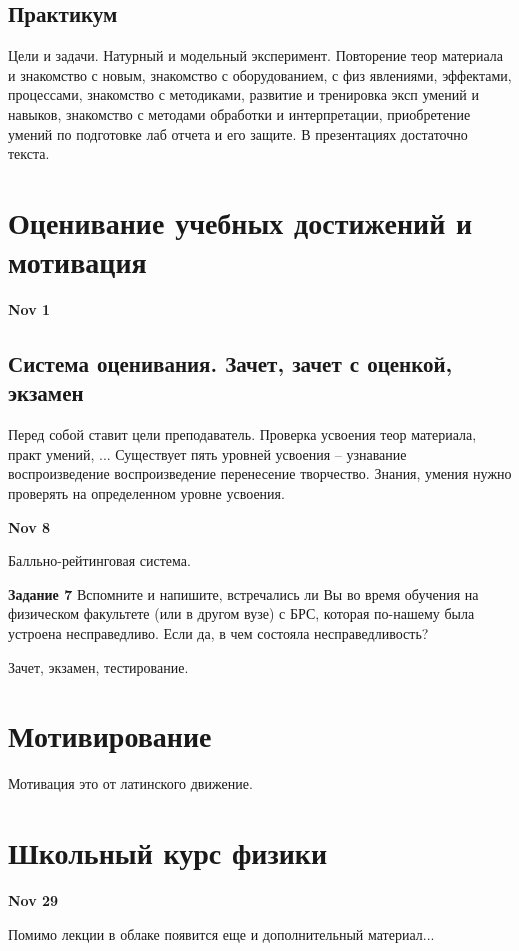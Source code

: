 \documentclass[a4paper, 12pt]{article}
\begin{document}
\subsection{Практикум}

Цели и задачи. Натурный и модельный эксперимент. Повторение теор 
материала и знакомство с новым, знакомство с оборудованием, с физ 
явлениями, эффектами, процессами, знакомство с методиками, развитие 
и тренировка эксп умений и навыков, знакомство с методами обработки 
и интерпретации, приобретение умений по подготовке лаб отчета и его 
защите. В презентациях достаточно текста.


\section{Оценивание учебных достижений и мотивация}

\hfill\textbf{Nov 1}

\subsection{Система оценивания. Зачет, зачет с оценкой, экзамен}

Перед собой ставит цели преподаватель. Проверка усвоения теор материала, 
практ умений, ... Существует пять уровней усвоения -- узнавание 
воспроизведение воспроизведение перенесение творчество. Знания, умения 
нужно проверять на определенном уровне усвоения.

\hfill\textbf{Nov 8}

Балльно-рейтинговая система.

\textbf{Задание 7} Вспомните и напишите, встречались ли Вы во время 
обучения на физическом факультете (или в другом вузе) с БРС, которая 
по-нашему была устроена несправедливо. Если да, в чем состояла 
несправедливость?

Зачет, экзамен, тестирование.


\section{Мотивирование}

Мотивация это от латинского движение.


\section{Школьный курс физики}
\hfill \textbf{Nov 29}

Помимо лекции в облаке появится еще и дополнительный материал...
\end{document}
